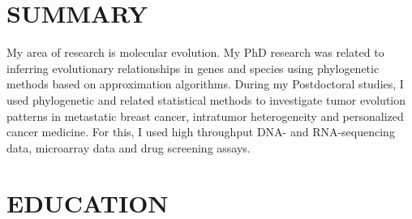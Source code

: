 \documentclass[margin, 10pt]{res} %
\begin{document}
\begin{resume}

 
\section{SUMMARY}
My area of research is molecular evolution. My PhD research was related to inferring evolutionary relationships in genes and species using phylogenetic methods based on approximation algorithms. During my Postdoctoral studies, I used phylogenetic and related statistical methods to investigate tumor evolution patterns in metastatic breast cancer, intratumor heterogeneity and personalized cancer medicine. For this, I used high throughput DNA- and RNA-sequencing data, microarray data and drug screening assays. 




\section{EDUCATION}


\end{resume}
\end{document}
